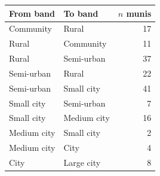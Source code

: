 \begin{tabular}{llr}
\toprule
From band & To band & $n$ munis \\
\midrule
Community & Rural & 17 \\
Rural & Community & 11 \\
Rural & Semi-urban & 37 \\
Semi-urban & Rural & 22 \\
Semi-urban & Small city & 41 \\
Small city & Semi-urban & 7 \\
Small city & Medium city & 16 \\
Medium city & Small city & 2 \\
Medium city & City & 4 \\
City & Large city & 8 \\
\bottomrule
\end{tabular}
%
